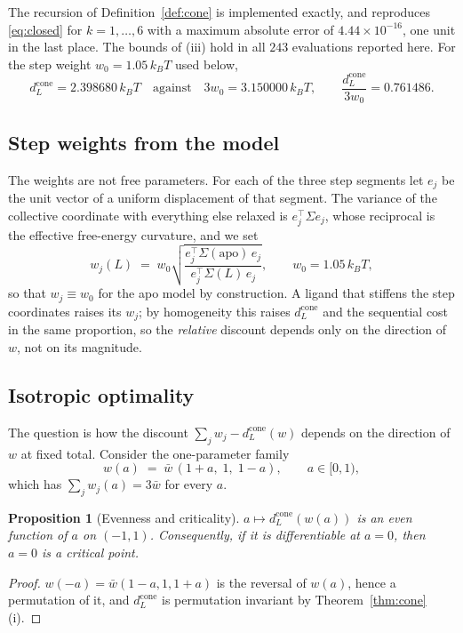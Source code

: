 \documentclass[11pt,reqno]{amsart}
\theoremstyle{plain}
\newtheorem{proposition}[theorem]{Proposition}
\theoremstyle{definition}
\theoremstyle{remark}
\numberwithin{equation}{section}
\newcommand{\dcone}{d_L^{\mathrm{cone}}}
\newcommand{\kT}{k_{B}T}
\begin{document}
The recursion of Definition~\ref{def:cone} is implemented exactly, and reproduces \eqref{eq:closed} for $k=1,\dots,6$ with a maximum absolute error of $4.44\times10^{-16}$, one unit in the last place. The bounds of (iii) hold in all $243$ evaluations reported here. For the step weight $w_0=1.05\,\kT$ used below,
\[
\dcone=2.398680\,\kT
\quad\text{against}\quad
3w_0=3.150000\,\kT,
\qquad
\frac{\dcone}{3w_0}=0.761486 .
\]

\subsection{Step weights from the model}
The weights are not free parameters. For each of the three step segments let $e_j$ be the unit vector of a uniform displacement of that segment. The variance of the collective coordinate with everything else relaxed is $e_j^{\!\top}\Sigma e_j$, whose reciprocal is the effective free-energy curvature, and we set
\begin{equation}
\label{eq:weights}
w_j(L)\;=\;w_0\sqrt{\frac{e_j^{\!\top}\Sigma(\text{apo})\,e_j}{e_j^{\!\top}\Sigma(L)\,e_j}},
\qquad w_0=1.05\,\kT,
\end{equation}
so that $w_j\equiv w_0$ for the apo model by construction. A ligand that stiffens the step coordinates raises its $w_j$; by homogeneity this raises $\dcone$ and the sequential cost in the same proportion, so the \emph{relative} discount depends only on the direction of $w$, not on its magnitude.

\subsection{Isotropic optimality}
\label{sec:aniso}
The question is how the discount $\sum_jw_j-\dcone(w)$ depends on the direction of $w$ at fixed total. Consider the one-parameter family
\begin{equation}
\label{eq:family}
w(a)\;=\;\bar w\,(1+a,\;1,\;1-a),\qquad a\in[0,1),
\end{equation}
which has $\sum_j w_j(a)=3\bar w$ for every $a$.

\begin{proposition}[Evenness and criticality]
\label{prop:even}
$a\mapsto\dcone(w(a))$ is an even function of $a$ on $(-1,1)$. Consequently, if it is differentiable at $a=0$, then $a=0$ is a critical point.
\end{proposition}

\begin{proof}
$w(-a)=\bar w(1-a,1,1+a)$ is the reversal of $w(a)$, hence a permutation of it, and $\dcone$ is permutation invariant by Theorem~\ref{thm:cone}(i).
\end{proof}
\end{document}
